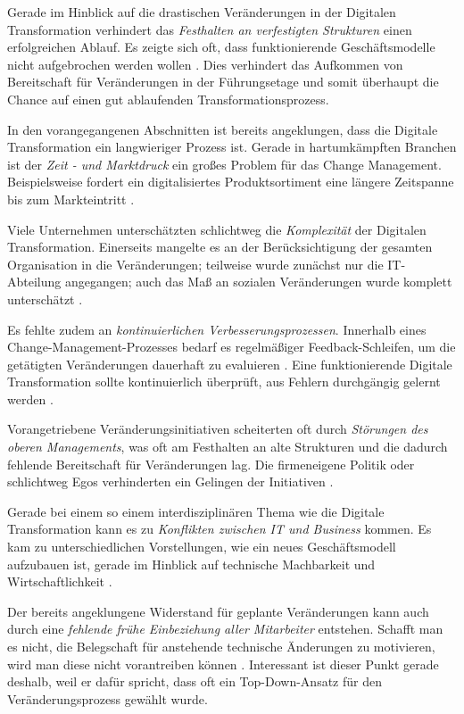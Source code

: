 Gerade im Hinblick auf die drastischen Veränderungen in der Digitalen Transformation verhindert das \textit{Festhalten an verfestigten Strukturen} einen erfolgreichen Ablauf. Es zeigte sich oft, dass funktionierende Geschäftsmodelle nicht aufgebrochen werden wollen \cite[S. 194]{gassmann_digitale_2016}. Dies verhindert das Aufkommen von Bereitschaft für Veränderungen in der Führungsetage und somit überhaupt die Chance auf einen gut ablaufenden Transformationsprozess.

In den vorangegangenen Abschnitten ist bereits angeklungen, dass die Digitale Transformation ein langwieriger Prozess ist. Gerade in hartumkämpften Branchen ist der \textit{Zeit - und Marktdruck} ein großes Problem für das Change Management. Beispielsweise fordert ein digitalisiertes Produktsortiment eine längere Zeitspanne bis zum Markteintritt \cite[S. 183]{urbach_digitalization_2018}.

Viele Unternehmen unterschätzten schlichtweg die \textit{Komplexität} der Digitalen Transformation. Einerseits mangelte  es an der Berücksichtigung der gesamten Organisation in die Veränderungen; teilweise wurde zunächst nur die IT-Abteilung angegangen; auch das Maß an sozialen Veränderungen wurde komplett unterschätzt \cite[S. 4]{hoberg_skills_2017}.

Es fehlte zudem an \textit{kontinuierlichen Verbesserungsprozessen}. Innerhalb eines Change-Management-Prozesses bedarf es regelmäßiger Feedback-Schleifen, um die getätigten Veränderungen dauerhaft zu evaluieren \cite[S. 13]{kaune_change_2016}. Eine funktionierende Digitale Transformation sollte kontinuierlich überprüft, aus Fehlern durchgängig gelernt werden \cite[S. 15]{chanias_digital_2018}.

Vorangetriebene Veränderungsinitiativen scheiterten oft durch \textit{Störungen des oberen Managements}, was oft am Festhalten an alte Strukturen und die dadurch fehlende Bereitschaft für Veränderungen lag. Die firmeneigene Politik oder schlichtweg Egos verhinderten ein Gelingen der Initiativen \cite[S. 4]{solis_2017_2017}.

Gerade bei einem so einem interdisziplinären Thema wie die Digitale Transformation kann es zu \textit{Konflikten zwischen IT und Business} kommen. Es kam zu unterschiedlichen Vorstellungen, wie ein neues Geschäftsmodell aufzubauen ist, gerade im Hinblick auf technische Machbarkeit und Wirtschaftlichkeit \cite[S. 117]{oswald_digitale_2018}.

Der bereits angeklungene Widerstand für geplante Veränderungen kann auch durch eine \textit{fehlende frühe Einbeziehung aller Mitarbeiter} entstehen. Schafft man es nicht, die Belegschaft  für anstehende technische Änderungen zu motivieren, wird man diese nicht vorantreiben können \cite[S. 40]{kawohl_digitale_2016}. Interessant ist dieser Punkt gerade deshalb, weil er dafür spricht, dass oft ein Top-Down-Ansatz für den Veränderungsprozess gewählt wurde.

